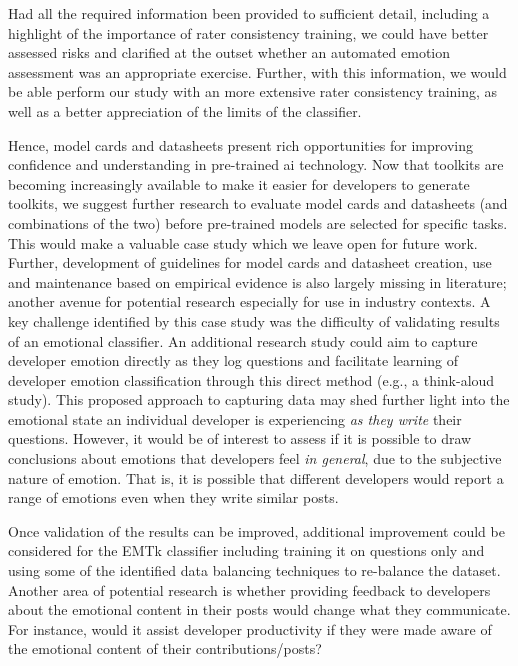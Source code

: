 Had all the required information been provided to sufficient detail, including a highlight of the importance of rater consistency training, we could have better assessed risks and clarified at the outset whether an automated emotion assessment was an appropriate exercise. Further, with this information, we would be able perform our study with an more extensive rater consistency training, as well as a better appreciation of the limits of the classifier. 

{Hence, model cards and datasheets present rich opportunities for improving confidence and understanding in pre-trained \gls{ai} technology.} Now that toolkits are becoming increasingly available to make it easier for developers to generate toolkits, we suggest further research to evaluate model cards and datasheets (and combinations of the two) before pre-trained models are selected for specific tasks. This would make a valuable case study which we leave open for future work. Further, development of guidelines for model cards and datasheet creation, use and maintenance based on empirical evidence is also largely missing in literature; another avenue for potential research especially for use in industry contexts. A key challenge identified by this case study was the difficulty of validating results of an emotional classifier.  An additional research study could aim to capture developer emotion directly as they log questions and facilitate learning of developer emotion classification through this direct method (e.g., a think-aloud study).  This proposed approach to capturing data may shed further light into the emotional state an individual developer is experiencing \textit{as they write} their questions. However, it would be of interest to assess if it is possible to draw conclusions about emotions that developers feel \textit{in general}, due to the subjective nature of emotion.  That is, it is possible that different developers would report a range of emotions even when they write similar posts.

Once validation of the results can be improved, additional improvement could be considered for the EMTk classifier including training it on questions only and using some of the identified data balancing techniques to re-balance the dataset. Another area of potential research is whether providing feedback to developers about the emotional content in their posts would change what they communicate. For instance, would it assist developer productivity if they were made aware of the emotional content of their contributions/posts?   

